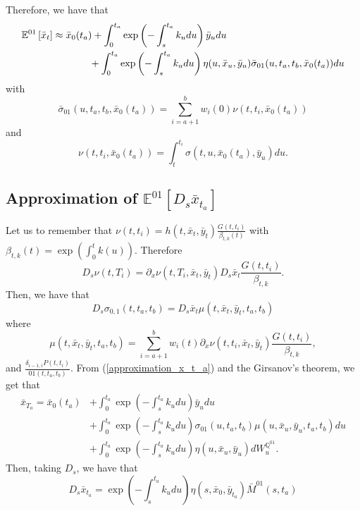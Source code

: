 \documentclass[a4paper,10pt]{article}
\newcommand{\1}{\mathbf{1}}
\begin{document}
Therefore, we have that
\begin{align}
\mathbb{E}^{01}\left[\bar{x}_t\right] &\approx \bar{x}_0(t_a)  + \int_{0}^{t_a} \exp\left(-\int_{s}^{t_a}k_u du\right) \bar{y}_u du \nonumber \\ 
&\hspace{1.3cm} + \int_{0}^{t_a} \exp\left(-\int_{s}^{t_a}k_u du \right) \eta(u,\bar{x}_u,\bar{y}_u) \bar{\sigma}_{01}(u, t_a, t_b,\bar{x}_0(t_a)) du
\end{align}
with
$$
\bar{\sigma}_{01}(u, t_a, t_b,\bar{x}_0(t_a)) = \sum_{i=a+1}^{b} w_i(0) \nu(t,t_i,\bar{x}_0(t_a))
$$
and
$$
\nu(t,t_i,\bar{x}_0(t_a)) = \int_{t}^{t_i} \sigma(t,u,\bar{x}_0(t_a),\bar{y}_u) du.
$$ 

\subsection{Approximation of $\mathbb{E}^{01}\left[D_s \bar{x}_{t_a} \right]$}\label{approximation_under_annuity_measeure_d_s}
Let us to remember that $\nu(t,t_i)=h(t,\bar{x}_t,\bar{y}_t) \frac{G(t,t_i)}{\beta_{t,k}(t)}$ with  $\beta_{t,k}(t) = \exp\left(\int_{0}^{t}k(u)\right)$.
Therefore 
\begin{equation*}
D_s \nu(t,T_i) = \partial_x \nu(t,T_i, \bar{x}_t, \bar{y}_t) D_s \bar{x}_t  \frac{G(t,t_i)}{\beta_{t,k}}.
\end{equation*}
Then, we have that
\begin{equation}
D_s \sigma_{0,1}(t,t_a,t_b) =  D_s \bar{x}_t \mu(t,\bar{x}_t, \bar{y}_t, t_a,t_b)
\end{equation}
where 
$$
\mu(t,\bar{x}_t, \bar{y}_t, t_a,t_b) =  \sum_{i=a+1}^{b} w_i(t) \partial_x \nu(t,t_i, \bar{x}_t, \bar{y}_t) \frac{G(t,t_i)}{\beta_{t,k}},
$$
and $\frac{\delta_{i-1,i} P(t,t_i)}{01(t,t_a,t_b)}$. From (\ref{approximation_x_t_a})  and the Girsanov's theorem, we get that
\begin{align*}
\bar{x}_{T_a} =  \bar{x}_0(t_a)  &+ \int_{0}^{t_a} \exp\left(-\int_{s}^{t_a}k_u du\right) \bar{y}_u du \nonumber \\\ 
&+ \int_{0}^{t_a} \exp\left(-\int_{s}^{t_a}k_u du\right) \sigma_{01}(u,t_a,t_b) \mu(u,\bar{x}_u, \bar{y}_u, t_a,t_b) du \nonumber \\\
&+  \int_{0}^{t_a}  \exp\left(-\int_{s}^{t_a}k_u du \right) \eta(u,\bar{x}_u,\bar{y}_u) dW_u^{\mathbb{Q}^{01}}.
\end{align*}
Then, taking $D_s$, we have that
\begin{equation*}
D_s \bar{x}_{t_a} = \exp\left(-\int_{s}^{t_a}k_u du \right) \eta(s,\bar{x}_0,\bar{y}_{t_a})\bar{M}^{01}(s,t_a)
\end{equation*}
\end{document}
